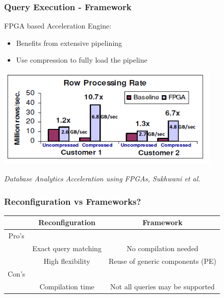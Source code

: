 \documentclass{beamer}
\begin{document}
\begin{frame}
	\frametitle{Query Execution - Framework}
	FPGA based Acceleration Engine:
	\begin{itemize}
		\item Benefits from extensive pipelining
		\item Use compression to fully load the pipeline
	\end{itemize}
	
	\begin{center}
		\includegraphics[width=0.8\textwidth]{img/engine_eval.png}
	\end{center}

	\begin{center}
		\small \emph{Database Analytics Acceleration using FPGAs, Sukhwani et al.}
	\end{center}
\end{frame}

\begin{frame}
\frametitle{Reconfiguration vs Frameworks?}
\begin{center}
	\begin{tabular}{| c | c | c |}
		\hline
		& Reconfiguration & Framework \\ \hline
		Pro's && \\ \hline
		& Exact query matching & No compilation needed\\ \hline
			  & High flexibility  & Reuse of generic components (PE) \\ \hline  
		Con's && \\ \hline
		& Compilation time &  Not all queries may be supported \\ \hline
	\end{tabular}
\end{center}

\end{frame}
\end{document}
